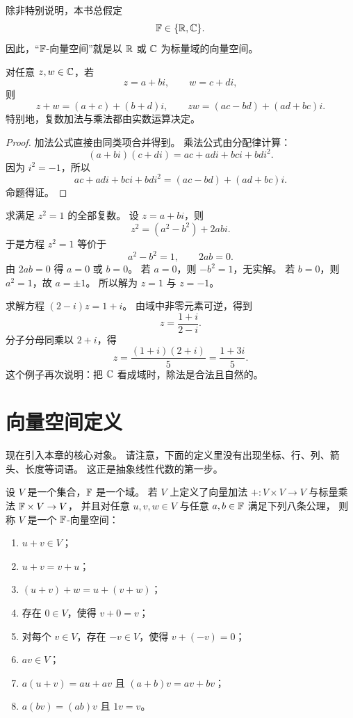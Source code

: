 \begin{notation} 除非特别说明，本书总假定
\[ \mathbb{F}\in\{\mathbb{R},\mathbb{C}\}.
\] 因此，“$\mathbb{F}$-向量空间”就是以 $\mathbb{R}$ 或 $\mathbb{C}$ 为标量域的向量空间。
\end{notation}

\begin{proposition} 对任意 $z,w\in\mathbb{C}$，若
\[ z=a+bi,\qquad w=c+di,
\] 则
\[ z+w=(a+c)+(b+d)i,
\qquad zw=(ac-bd)+(ad+bc)i.
\] 特别地，复数加法与乘法都由实数运算决定。
\end{proposition}

\begin{proof} 加法公式直接由同类项合并得到。
乘法公式由分配律计算： \[
(a+bi)(c+di)=ac+adi+bci+bdi^2. \]
因为 $i^2=-1$，所以 \[
ac+adi+bci+bdi^2=(ac-bd)+(ad+bc)i. \]
命题得证。 \end{proof}

\begin{example} 求满足 $z^2=1$ 的全部复数。
设 $z=a+bi$，则 \[
z^2=(a^2-b^2)+2abi. \]
于是方程 $z^2=1$ 等价于 \[
a^2-b^2=1, \qquad
2ab=0. \]
由 $2ab=0$ 得 $a=0$ 或 $b=0$。 若 $a=0$，则 $-b^2=1$，无实解。
若 $b=0$，则 $a^2=1$，故 $a=\pm 1$。 所以解为 $z=1$ 与 $z=-1$。
\end{example}

\begin{example} 求解方程 $(2-i)z=1+i$。
由域中非零元素可逆，得到 \[
z=\frac{1+i}{2-i}. \]
分子分母同乘以 $2+i$，得 \[
z=\frac{(1+i)(2+i)}{5}=\frac{1+3i}{5}. \]
这个例子再次说明：把 $\mathbb{C}$ 看成域时，除法是合法且自然的。 \end{example}

\section{向量空间定义}

现在引入本章的核心对象。 请注意，下面的定义里没有出现坐标、行、列、箭头、长度等词语。
这正是抽象线性代数的第一步。

\begin{definition} 设 $V$ 是一个集合，$\mathbb{F}$ 是一个域。
若 $V$ 上定义了向量加法 $+:V\times V\to V$ 与标量乘法 $\mathbb{F}\times V\to V$， 并且对任意 $u,v,w\in V$ 与任意 $a,b\in\mathbb{F}$ 满足下列八条公理，
则称 $V$ 是一个 $\mathbb{F}$-向量空间： \begin{enumerate}[label=\textup{(\arabic*)}]
\item $u+v\in V$； \item $u+v=v+u$；
\item $(u+v)+w=u+(v+w)$； \item 存在 $0\in V$，使得 $v+0=v$；
\item 对每个 $v\in V$，存在 $-v\in V$，使得 $v+(-v)=0$； \item $av\in V$；
\item $a(u+v)=au+av$ 且 $(a+b)v=av+bv$； \item $a(bv)=(ab)v$ 且 $1v=v$。
\end{enumerate} \end{definition}

